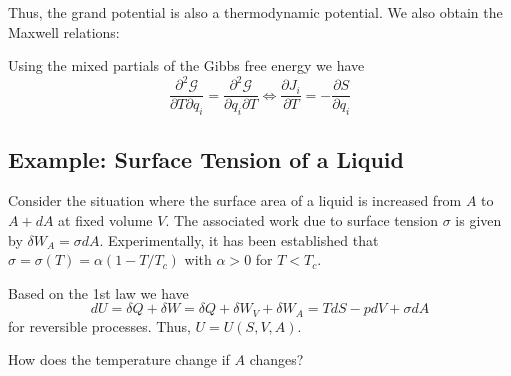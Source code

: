 \documentclass[12pt, a4paper, oneside, openright, titlepage]{book}
\begin{document}
Thus, the grand potential is also a thermodynamic potential. We also obtain the Maxwell relations:


\begin{prop}
    Using the mixed partials of the Gibbs free energy we have \begin{equation*}
        \frac{\partial^2\mathcal{G}}{\partial T\partial q_i} = \frac{\partial^2\mathcal{G}}{\partial q_i\partial T}\iff \frac{\partial J_i}{\partial T} = -\frac{\partial S}{\partial q_i}
    \end{equation*}
\end{prop}

\subsection{Example: Surface Tension of a Liquid}

Consider the situation where the surface area of a liquid is increased from $A$ to $A+dA$ at fixed volume $V$. The associated work due to surface tension $\sigma$ is given by $\delta W_A = \sigma dA$. Experimentally, it has been established that $\sigma = \sigma(T) = \alpha(1-T/T_c)$ with $\alpha > 0$ for $T < T_c$.

Based on the 1st law we have \begin{equation*}
    dU = \delta Q + \delta W = \delta Q + \delta W_V + \delta W_A = TdS - pdV + \sigma dA
\end{equation*}
for reversible processes. Thus, $U = U(S,V,A)$.

\begin{qst}
    How does the temperature change if $A$ changes?
\end{qst}
\end{document}
